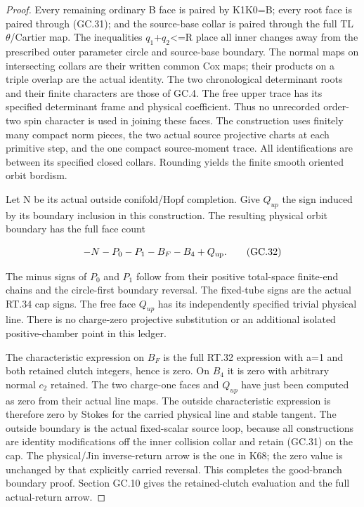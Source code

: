 \begin{proof}
Every remaining ordinary B face is paired by K1K0=B; every
root face is paired through (GC.31); and the source-base collar
is paired through the full TL \(\theta\)/Cartier map. The inequalities
\textbar{}\(q_1\)\textbar+\textbar{}\(q_2\)\textbar\textless=R place all inner changes away from the prescribed
outer parameter circle and source-base boundary. The normal
maps on intersecting collars are their written common Cox maps;
their products on a triple overlap are the actual identity.
The two chronological determinant roots and their finite
characters are those of GC.4. The free upper trace has its
specified determinant frame and physical coefficient. Thus no
unrecorded order-two spin character is used in joining these
faces. The construction uses finitely many compact norm pieces,
the two actual source projective charts at each primitive step,
and the one compact source-moment trace. All identifications are
between its specified closed collars. Rounding yields the finite
smooth oriented orbit bordism.

Let N be its actual outside conifold/Hopf completion. Give \(Q_{up}\)
the sign induced by its boundary inclusion in this construction.
The resulting physical orbit boundary has the full face count

\[
                  -N-P_0-P_1-B_F-B_4+Q_{\rm up}.
 \tag{GC.32}
\]

The minus signs of \(P_0\) and \(P_1\) follow from their positive total-space
finite-end chains and the circle-first boundary reversal. The
fixed-tube signs are the actual RT.34 cap signs. The free face
\(Q_{up}\) has its independently specified trivial physical line.
There is no charge-zero projective substitution or an additional
isolated positive-chamber point in this ledger.

The characteristic expression on \(B_F\) is the full RT.32 expression
with a=1 and both retained clutch integers, hence is zero. On \(B_4\)
it is zero with arbitrary normal \(c_2\) retained. The two charge-one
faces and \(Q_{up}\) have just been computed as zero from their actual
line maps. The outside characteristic expression is therefore
zero by Stokes for the carried physical line and stable tangent.
The outside boundary is the actual fixed-scalar source loop,
because all constructions are identity modifications off the
inner collision collar and retain (GC.31) on the cap. The
physical/Jin inverse-return arrow is the one in K68; the zero
value is unchanged by that explicitly carried reversal. This
completes the good-branch boundary proof. Section GC.10 gives
the retained-clutch evaluation and the full actual-return arrow.


\end{proof}
